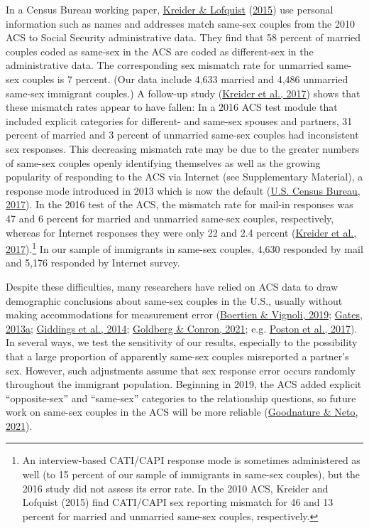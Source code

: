 \documentclass[
  11pt,
]{article}
\begin{document}
In a Census Bureau working paper, \protect\hyperlink{ref-kreider_2015}{Kreider \& Lofquist} (\protect\hyperlink{ref-kreider_2015}{2015}) use personal information such as names and addresses match same-sex couples from the 2010 ACS to Social Security administrative data. They find that 58 percent of married couples coded as same-sex in the ACS are coded as different-sex in the administrative data. The corresponding sex mismatch rate for unmarried same-sex couples is 7 percent. (Our data include 4,633 married and 4,486 unmarried same-sex immigrant couples.) A follow-up study (\protect\hyperlink{ref-kreider_2017}{Kreider et al., 2017}) shows that these mismatch rates appear to have fallen: In a 2016 ACS test module that included explicit categories for different- and same-sex spouses and partners, 31 percent of married and 3 percent of unmarried same-sex couples had inconsistent sex responses. This decreasing mismatch rate may be due to the greater numbers of same-sex couples openly identifying themselves as well as the growing popularity of responding to the ACS via Internet (see Supplementary Material), a response mode introduced in 2013 which is now the default (\protect\hyperlink{ref-u.s.censusbureau_2017}{U.S. Census Bureau, 2017}). In the 2016 test of the ACS, the mismatch rate for mail-in responses was 47 and 6 percent for married and unmarried same-sex couples, respectively, whereas for Internet responses they were only 22 and 2.4 percent (\protect\hyperlink{ref-kreider_2017}{Kreider et al., 2017}).\footnote{An interview-based CATI/CAPI response mode is sometimes administered as well (to 15 percent of our sample of immigrants in same-sex couples), but the 2016 study did not assess its error rate. In the 2010 ACS, Kreider and Lofquist (2015) find CATI/CAPI sex reporting mismatch for 46 and 13 percent for married and unmarried same-sex couples, respectively.} In our sample of immigrants in same-sex couples, 4,630 responded by mail and 5,176 responded by Internet survey.

Despite these difficulties, many researchers have relied on ACS data to draw demographic conclusions about same-sex couples in the U.S., usually without making accommodations for measurement error (\protect\hyperlink{ref-boertien_2019}{Boertien \& Vignoli, 2019}; \protect\hyperlink{ref-gates_2013}{Gates, 2013a}; \protect\hyperlink{ref-giddings_2014}{Giddings et al., 2014}; \protect\hyperlink{ref-goldberg_2021}{Goldberg \& Conron, 2021}; e.g. \protect\hyperlink{ref-poston_2017}{Poston et al., 2017}). In several ways, we test the sensitivity of our results, especially to the possibility that a large proportion of apparently same-sex couples misreported a partner's sex. However, such adjustments assume that sex response error occurs randomly throughout the immigrant population. Beginning in 2019, the ACS added explicit ``opposite-sex'' and ``same-sex'' categories to the relationship questions, so future work on same-sex couples in the ACS will be more reliable (\protect\hyperlink{ref-goodnature_2021}{Goodnature \& Neto, 2021}).
\end{document}
